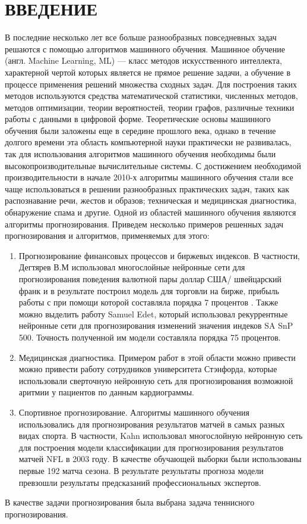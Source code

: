 \newpage
\section*{ВВЕДЕНИЕ}
В последние несколько лет все больше разнообразных повседневных задач решаются с помощью алгоритмов машинного обучения. Машинное обучение (англ. Machine Learning, ML) — класс методов искусственного интеллекта, характерной чертой которых является не прямое решение задачи, а обучение в процессе применения решений множества сходных задач. Для построения таких методов используются средства математической статистики, численных методов, методов оптимизации, теории вероятностей, теории графов, различные техники работы с данными в цифровой форме. Теоретические основы машинного обучения были заложены еще в середине прошлого века, однако в течение долгого времени эта область компьютерной науки практически не развивалась, так для использования алгоритмов машинного обучения необходимы были высокопроизводительные вычислительные системы. С достижением необходимой производительности в начале 2010-х алгоритмы машинного обучения стали все чаще использоваться в решении разнообразных практических задач, таких как распознавание речи, жестов и образов; техническая и медицинская диагностика, обнаружение спама и другие.  
Одной из областей машинного обучения являются алгоритмы прогнозирования. Приведем несколько примеров решенных задач прогнозирования и алгоритмов, применяемых для этого:
\begin{enumerate}
	\item
Прогнозирование финансовых процессов и биржевых индексов. В частности, Дегтярев В.М использовал многослойные нейронные сети для прогнозирования поведения валютной пары доллар США/ швейцарский франк и в результате построил модель для торговли на бирже, прибыль работы с при помощи которой составляла порядка 7 процентов \cite{one}. Также можно выделить работу Samuel Edet, который использовал рекуррентные нейронные сети для прогнозирования изменений значения индеков SA SnP 500\cite{two}. Точность полученной им модели составляла порядка 75 процентов.	
	\item
Медицинская диагностика. Примером работ в этой области можно привести можно привести работу сотрудников университета Стэнфорда, которые использовали сверточную нейронную сеть для прогнозирования возможной аритмии у пациентов по данным кардиограммы.\cite{cardio}
	\item
Спортивное прогнозирование. Алгоритмы машинного обучения использовались для прогнозирования результатов матчей в самых разных видах спорта. В частности, Kahn использовал многослойную нейронную сеть для построения модели классификации для прогнозирования результатов матчей NFL в 2003 году. В качестве обучающей выборки были использованы первые 192 матча сезона. В результате результаты прогноза модели превзошли результаты предсказаний профессиональных экспертов. \cite{four}
\end{enumerate}
В качестве задачи прогнозирования была выбрана задача теннисного прогнозирования.
